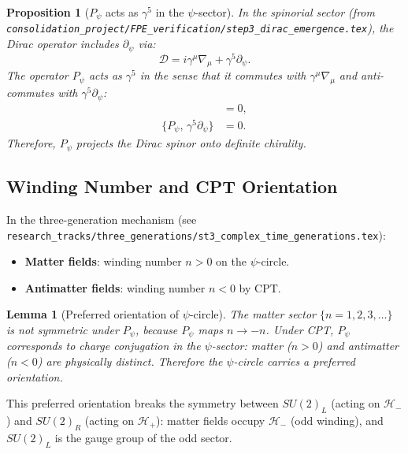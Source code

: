\documentclass[12pt,a4paper]{article}
\newtheorem{lemma}[theorem]{Lemma}
\newtheorem{proposition}[theorem]{Proposition}
\theoremstyle{definition}
\theoremstyle{remark}
\begin{document}
\begin{proposition}[$P_\psi$ acts as $\gamma^5$ in the $\psi$-sector]
\label{prop:gamma5}
In the spinorial sector (from
\texttt{consolidation\_project/FPE\_verification/step3\_dirac\_emergence.tex}),
the Dirac operator includes $\partial_\psi$ via:
\begin{equation}
  \mathcal{D} = i\gamma^\mu\nabla_\mu + \gamma^5 \partial_\psi.
\label{eq:dirac_with_psi}
\end{equation}
The operator $P_\psi$ acts as $\gamma^5$ in the sense that it commutes with
$\gamma^\mu\nabla_\mu$ and anti-commutes with $\gamma^5\partial_\psi$:
\begin{align}
  [P_\psi,\, \gamma^\mu\nabla_\mu] &= 0, \\
  \{P_\psi,\, \gamma^5\partial_\psi\} &= 0.
\end{align}
Therefore, $P_\psi$ \emph{projects} the Dirac spinor onto definite chirality.
\end{proposition}

\subsection{Winding Number and CPT Orientation}
\label{subsec:winding}

In the three-generation mechanism (see
\texttt{research\_tracks/three\_generations/st3\_complex\_time\_generations.tex}):
\begin{itemize}
  \item \textbf{Matter fields}: winding number $n > 0$ on the $\psi$-circle.
  \item \textbf{Antimatter fields}: winding number $n < 0$ by CPT.
\end{itemize}

\begin{lemma}[Preferred orientation of $\psi$-circle]
The matter sector $\{n=1,2,3,\ldots\}$ is not symmetric under $P_\psi$,
because $P_\psi$ maps $n \to -n$.
Under CPT, $P_\psi$ corresponds to charge conjugation in the $\psi$-sector:
matter ($n>0$) and antimatter ($n<0$) are physically distinct.
Therefore the $\psi$-circle carries a preferred orientation.
\end{lemma}

This preferred orientation breaks the symmetry between $SU(2)_L$ (acting on
$\mathcal{H}_-$) and $SU(2)_R$ (acting on $\mathcal{H}_+$):
matter fields occupy $\mathcal{H}_-$ (odd winding), and $SU(2)_L$ is
the gauge group of the odd sector.
\end{document}
